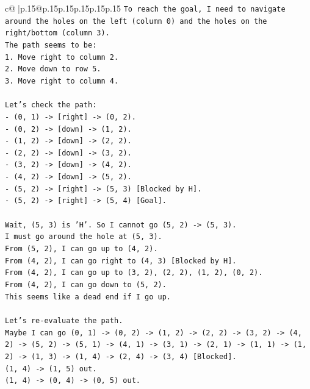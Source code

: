 \documentclass{article}
\begin{document}
{\begin{supertabular}{c@{$\;$}|p{.15\linewidth}@{}p{.15\linewidth}p{.15\linewidth}p{.15\linewidth}p{.15\linewidth}p{.15\linewidth}}
{{{\texttt{To reach the goal, I need to navigate around the holes on the left (column 0) and the holes on the right/bottom (column 3).} \\
\texttt{The path seems to be:} \\
\texttt{1. Move right to column 2.} \\
\texttt{2. Move down to row 5.} \\
\texttt{3. Move right to column 4.} \\
\\ 
\texttt{Let's check the path:} \\
\texttt{{-} (0, 1) {-}> {[}right{]} {-}> (0, 2).} \\
\texttt{{-} (0, 2) {-}> {[}down{]} {-}> (1, 2).} \\
\texttt{{-} (1, 2) {-}> {[}down{]} {-}> (2, 2).} \\
\texttt{{-} (2, 2) {-}> {[}down{]} {-}> (3, 2).} \\
\texttt{{-} (3, 2) {-}> {[}down{]} {-}> (4, 2).} \\
\texttt{{-} (4, 2) {-}> {[}down{]} {-}> (5, 2).} \\
\texttt{{-} (5, 2) {-}> {[}right{]} {-}> (5, 3) {[}Blocked by H{]}.} \\
\texttt{{-} (5, 2) {-}> {[}right{]} {-}> (5, 4) {[}Goal{]}.} \\
\\ 
\texttt{Wait, (5, 3) is 'H'. So I cannot go (5, 2) {-}> (5, 3).} \\
\texttt{I must go around the hole at (5, 3).} \\
\texttt{From (5, 2), I can go up to (4, 2).} \\
\texttt{From (4, 2), I can go right to (4, 3) {[}Blocked by H{]}.} \\
\texttt{From (4, 2), I can go up to (3, 2), (2, 2), (1, 2), (0, 2).} \\
\texttt{From (4, 2), I can go down to (5, 2).} \\
\texttt{This seems like a dead end if I go up.} \\
\\ 
\texttt{Let's re{-}evaluate the path.} \\
\texttt{Maybe I can go (0, 1) {-}> (0, 2) {-}> (1, 2) {-}> (2, 2) {-}> (3, 2) {-}> (4, 2) {-}> (5, 2) {-}> (5, 1) {-}> (4, 1) {-}> (3, 1) {-}> (2, 1) {-}> (1, 1) {-}> (1, 2) {-}> (1, 3) {-}> (1, 4) {-}> (2, 4) {-}> (3, 4) {[}Blocked{]}.} \\
\texttt{(1, 4) {-}> (1, 5) out.} \\
\texttt{(1, 4) {-}> (0, 4) {-}> (0, 5) out.} \\
}}}
\end{supertabular}}
\end{document}
